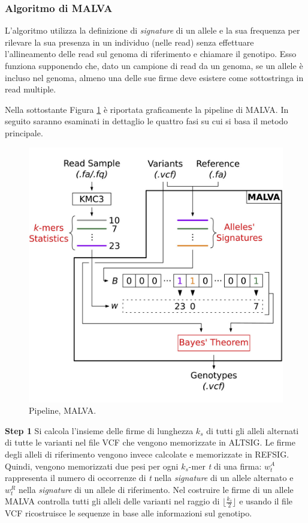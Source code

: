 \documentclass[../main.tex]{subfiles}
\begin{document}
\subsubsection{Algoritmo di MALVA}

L'algoritmo utilizza la definizione di \textit{signature} di un allele e la sua frequenza per rilevare la sua presenza in un individuo (nelle read) senza effettuare l'allineamento delle read sul genoma di riferimento e chiamare il genotipo. Esso funziona supponendo che, dato un campione di read da un genoma, se un allele è incluso nel genoma, almeno una delle sue firme deve esistere come sottostringa in read multiple. 

Nella sottostante Figura \ref{fig:malva} è riportata graficamente la pipeline di MALVA. In seguito saranno esaminati in dettaglio le quattro fasi su cui si basa il metodo principale.

 \begin{figure}[h!]
	\centering
  	\captionsetup{justification=centering}
 	\includegraphics[scale=.85]{images/malva-pipeline.jpg}
  	\caption{Pipeline, MALVA.}
  	\label{fig:malva}
\end{figure}

\noindent
\textbf{Step 1} Si calcola l'insieme delle firme di lunghezza \textit{${k}_{s}$} di tutti gli alleli alternati di tutte le varianti nel file VCF che vengono memorizzate in ALTSIG. Le firme degli alleli di riferimento vengono invece calcolate e memorizzate in REFSIG. Quindi, vengono memorizzati due pesi per ogni \textit{${k}_{s}$}-mer \textit{t} di una firma: \textit{$w_{t}^{A}$} rappresenta il numero di occorrenze di \textit{t} nella \textit{signature} di un allele alternato e \textit{$w_{t}^{R}$} nella \textit{signature} di un allele di riferimento. Nel costruire le firme di un allele MALVA controlla tutti gli alleli delle varianti nel raggio di $\lfloor \frac{ {{{k}_{s}} }}{2}  \rfloor$ e usando il file VCF ricostruisce le sequenze in base alle informazioni sul genotipo. 
\end{document}
